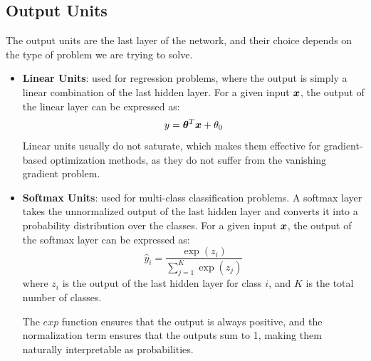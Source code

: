 \subsection{Output Units}
The output units are the last layer of the network, and their choice depends on the type of problem we are trying to solve.
\begin{itemize}
    \item \textbf{Linear Units}: used for regression problems, where the output is simply a linear combination of the last hidden layer. 
    For a given input $\boldsymbol{x}$, the output of the linear layer can be expressed as:
    \begin{equation*}
        y = \boldsymbol{\theta}^T \boldsymbol{x} + \theta_0
    \end{equation*}
    Linear units usually do not saturate, which makes them effective for gradient-based optimization methods, 
    as they do not suffer from the vanishing gradient problem.
    
    \item \textbf{Softmax Units}: used for multi-class classification problems. 
    A softmax layer takes the unnormalized output of the last hidden layer and converts it into a probability distribution over the classes.
    For a given input $\boldsymbol{x}$, the output of the softmax layer can be expressed as:
    \begin{equation*}
        \hat{y}_i = \frac{\exp(z_i)}{\sum_{j=1}^{K} \exp(z_j)}
    \end{equation*}
    where $z_i$ is the output of the last hidden layer for class $i$, and $K$ is the total number of classes.

    The $exp$ function ensures that the output is always positive, and the normalization term ensures that the outputs sum to 1, making them naturally interpretable as probabilities.
\end{itemize}
